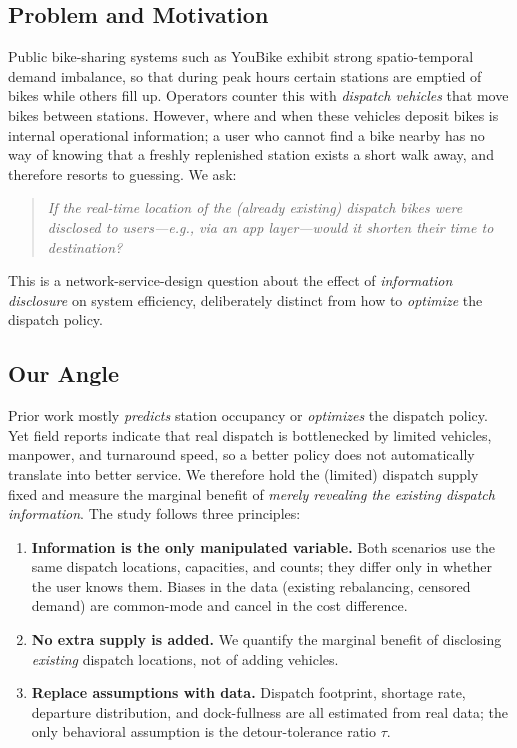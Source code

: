\documentclass[11pt,a4paper]{article}
\begin{document}
\subsection{Problem and Motivation}
Public bike-sharing systems such as YouBike exhibit strong spatio-temporal demand imbalance, so that during peak hours certain
stations are emptied of bikes while others fill up. Operators counter this with \emph{dispatch vehicles} that move bikes between
stations. However, where and when these vehicles deposit bikes is internal operational information; a user who cannot find a bike
nearby has no way of knowing that a freshly replenished station exists a short walk away, and therefore resorts to guessing. We ask:
\begin{quote}\itshape
If the real-time location of the (already existing) dispatch bikes were disclosed to users---e.g., via an app layer---would it
shorten their time to destination?
\end{quote}
This is a network-service-design question about the effect of \emph{information disclosure} on system efficiency, deliberately
distinct from how to \emph{optimize} the dispatch policy.

\subsection{Our Angle}
Prior work mostly \emph{predicts} station occupancy or \emph{optimizes} the dispatch policy. Yet field reports indicate that real
dispatch is bottlenecked by limited vehicles, manpower, and turnaround speed, so a better policy does not automatically translate
into better service. We therefore hold the (limited) dispatch supply fixed and measure the marginal benefit of \emph{merely
revealing the existing dispatch information}. The study follows three principles:
\begin{enumerate}[label=(\arabic*)]
\item \textbf{Information is the only manipulated variable.} Both scenarios use the same dispatch locations, capacities, and counts;
they differ only in whether the user knows them. Biases in the data (existing rebalancing, censored demand) are common-mode and
cancel in the cost difference.
\item \textbf{No extra supply is added.} We quantify the marginal benefit of disclosing \emph{existing} dispatch locations, not of adding
vehicles.
\item \textbf{Replace assumptions with data.} Dispatch footprint, shortage rate, departure distribution, and dock-fullness are all
estimated from real data; the only behavioral assumption is the detour-tolerance ratio $\tau$.
\end{enumerate}
\end{document}

